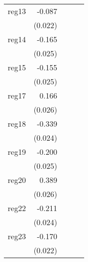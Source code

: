{\begin{longtable}{l*{4}{D{.}{.}{-1}}}
\addlinespace
reg13       &      -0.087\sym{***}&                     &                     &                     \\
            &     (0.022)         &                     &                     &                     \\
\addlinespace
reg14       &      -0.165\sym{***}&                     &                     &                     \\
            &     (0.025)         &                     &                     &                     \\
\addlinespace
reg15       &      -0.155\sym{***}&                     &                     &                     \\
            &     (0.025)         &                     &                     &                     \\
\addlinespace
reg17       &       0.166\sym{***}&                     &                     &                     \\
            &     (0.026)         &                     &                     &                     \\
\addlinespace
reg18       &      -0.339\sym{***}&                     &                     &                     \\
            &     (0.024)         &                     &                     &                     \\
\addlinespace
reg19       &      -0.200\sym{***}&                     &                     &                     \\
            &     (0.025)         &                     &                     &                     \\
\addlinespace
reg20       &       0.389\sym{***}&                     &                     &                     \\
            &     (0.026)         &                     &                     &                     \\
\addlinespace
reg22       &      -0.211\sym{***}&                     &                     &                     \\
            &     (0.024)         &                     &                     &                     \\
\addlinespace
reg23       &      -0.170\sym{***}&                     &                     &                     \\
            &     (0.022)         &                     &                     &                     \\

\end{longtable}}
